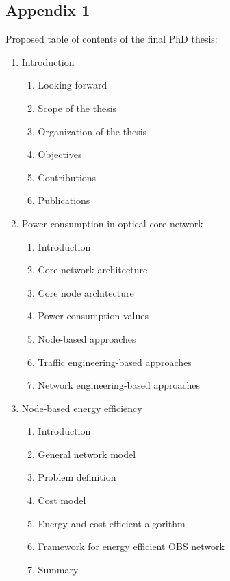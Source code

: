 \documentclass{article}
\begin{document}
\begin{enumerate}
      
\end{enumerate}


\appendix
\begin{center}
\section*{\LARGE Appendix 1}
\end{center}
Proposed table of contents of the final PhD thesis:
\begin{enumerate}
\item Introduction
\begin{enumerate}[i]
\item Looking forward
\item Scope of the thesis
\item Organization of the thesis
\item Objectives
\item Contributions
\item Publications 
\end{enumerate}
\item Power consumption in optical core network
\begin{enumerate}[i]
\item Introduction
\item Core network architecture
\item Core node architecture 
\item Power consumption values
\item Node-based approaches
\item Traffic engineering-based approaches
\item Network engineering-based approaches
\end{enumerate}
\item Node-based energy efficiency
\begin{enumerate}[i]
\item Introduction
\item General network model
\item Problem definition
\item Cost model
\item Energy and cost efficient algorithm
\item Framework for energy efficient OBS network
\item Summary
\end{enumerate}

\end{enumerate}
\end{document}
